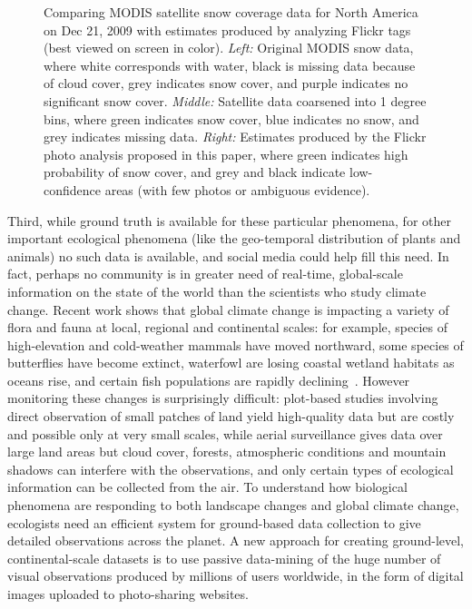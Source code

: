\documentclass[10pt,journal,compsoc]{IEEEtran}
\begin{document}
\begin{figure}[th]
\caption{Comparing MODIS satellite snow coverage data for North
  America on Dec 21, 2009 with estimates produced by analyzing Flickr
  tags (best viewed on screen in color). \textit{Left:} Original MODIS snow data, where white
  corresponds with water, black is missing data because of cloud
  cover, grey indicates snow cover, and purple indicates no
  significant snow cover.  \textit{Middle:} Satellite data coarsened
  into 1 degree bins, where green indicates snow cover, blue indicates
  no snow, and grey indicates missing data.  \textit{Right:} Estimates
  produced by the Flickr photo analysis proposed in this paper, where
  green indicates high probability of snow cover, and grey and black
  indicate low-confidence areas (with few photos or ambiguous evidence).}
\label{fig:samplemap}
\end{figure}


Third, while ground truth is available for these particular
phenomena, for other important ecological phenomena (like the geo-temporal distribution of plants and animals) no such data is
available, and social media could help fill this need.
In fact, perhaps no community is in greater need of
real-time, global-scale information on the state of the world than the
scientists who study climate change. Recent work shows that global
climate change is impacting a variety of flora and fauna at local,
regional and continental scales: for example, species of
high-elevation and cold-weather mammals have moved northward, some
species of butterflies have become extinct, waterfowl are losing
coastal wetland habitats as oceans rise, and certain fish populations
are rapidly declining~\cite{ipcc2007climate}. However monitoring these
changes is surprisingly difficult: plot-based studies
involving direct observation of small patches of land yield
high-quality data but are costly and possible only at very small
scales, while aerial surveillance gives data over
large land areas but cloud cover, forests, atmospheric
conditions and mountain shadows can interfere with the observations,
and only certain types of ecological information can be collected from
the air.  To understand how biological phenomena are responding to
both landscape changes and global climate change, ecologists need an
efficient system for ground-based data collection to give detailed
observations across the planet.  A new approach
for creating ground-level, continental-scale datasets is to use
passive data-mining of the huge number of visual observations produced
by millions of users worldwide, in the form of digital images uploaded
to photo-sharing websites.
\end{document}
